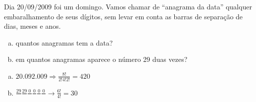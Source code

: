 \begin{ex}
 	Dia 20/09/2009 foi um domingo. Vamos chamar de “anagrama da data” qualquer embaralhamento de seus dígitos,  sem levar em conta as barras de separação de dias, meses e anos.
    \begin{enumerate}[(a)]
    \item quantos anagramas tem a data?
    \item em quantos anagramas aparece o número 29 duas vezes?
    \end{enumerate}
      \begin{sol}
        \phantom{A}  
        \begin{enumerate} [(a)]
            \item $20.092.009\Longrightarrow \frac{8!}{2!4!2!}=420$
            \item $\frac{29}{\phantom{A}}\frac{29}{\phantom{A}}\frac{0}{\phantom{A}}\frac{0}{\phantom{A}}\frac{0}{\phantom{A}}\frac{0}{\phantom{A}}\longrightarrow\frac{6!}{4!}=30$
        \end{enumerate}
      \end{sol}
\end{ex}